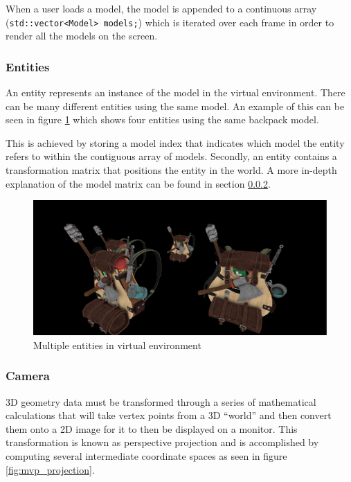 \documentclass[11pt]{article}
\begin{document}
When a user loads a model, the model is appended to a continuous array
(\lstinline{std::vector<Model> models;}) which is iterated over each frame in
order to render all the models on the screen.

\subsubsection{Entities}
An entity represents an instance of the model in the virtual environment. There
can be many different entities using the same model. An example of this can be
seen in figure \ref{fig:entities} which shows four entities using the same
backpack model.

This is achieved by storing a model index that indicates which model the entity
refers to within the contiguous array of models. Secondly, an entity contains a
transformation matrix that positions the entity in the world. A more in-depth
explanation of the model matrix can be found in section \ref{camera}.

\begin{figure}[H]
  \centering
  \includegraphics[width=\textwidth]{images/entities.png}
  \caption{Multiple entities in virtual environment}
  \label{fig:entities}
\end{figure}

\subsubsection{Camera} \label{camera}
3D geometry data must be transformed through a series of mathematical
calculations that will take vertex points from a 3D ``world'' and then convert
them onto a 2D image for it to then be displayed on a monitor. This
transformation is known as perspective projection \cite{3d_projection} and is
accomplished by computing several intermediate coordinate spaces as seen in
figure \ref{fig:mvp_projection}.
\end{document}
